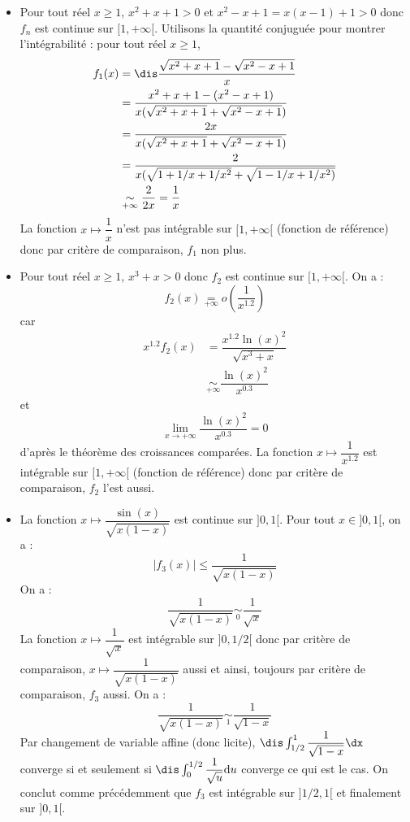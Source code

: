 \documentclass[a4paper,10pt]{report}
\begin{document}
\begin{itemize}
\item Pour tout réel $x \geq 1$, $x^2+x+1 > 0$ et $x^2-x+1=x(x-1)+1 >0$ donc $f_n$ est continue sur $[1, + \infty[$. Utilisons la quantité conjuguée pour montrer l'intégrabilité : pour tout réel $x \geq 1$,
\begin{align*}
f_1(x) & =\dis\frac{\sqrt{x^2+x+1}-\sqrt{x^2-x+1}}{x} \\
& = \dfrac{x^2+x+1-(x^2-x+1)}{x(\sqrt{x^2+x+1}+\sqrt{x^2-x+1})} \\
& = \dfrac{2x}{x(\sqrt{x^2+x+1}+\sqrt{x^2-x+1})} \\
& = \dfrac{2}{x(\sqrt{1+1/x+1/x^2}+ \sqrt{1-1/x+1/x^2)}} \\
& \underset{+ \infty}{\sim} \dfrac{2}{2x} = \dfrac{1}{x}
\end{align*}
La fonction $x \mapsto \dfrac{1}{x}$ n'est pas intégrable sur $[1, + \infty[$ (fonction de référence) donc par critère de comparaison, $f_1$ non plus.
\item Pour tout réel $x \geq 1$, $x^3+x>0$ donc $f_2$ est continue sur $[1, + \infty[$. On a :
$$ f_2(x) \underset{+\infty}{=} o \left( \dfrac{1}{x^{1.2}} \right)$$
car 
\begin{align*}
x^{1.2} f_2(x) & = \dfrac{x^{1.2} \ln(x)^2}{\sqrt{x^3+x}} \\
&  \underset{+ \infty}{\sim} \dfrac{\ln(x)^2}{x^{0.3}} 
\end{align*}
et 
$$ \lim_{x \rightarrow + \infty} \dfrac{\ln(x)^2}{x^{0.3}}  = 0$$
d'après le théorème des croissances comparées. La fonction $x \mapsto \dfrac{1}{x^{1.2}}$ est intégrable sur $[1, + \infty[$ (fonction de référence) donc par critère de comparaison, $f_2$ l'est aussi.
\item La fonction $x \mapsto \dfrac{\sin(x)}{\sqrt{x(1-x)}}$ est continue sur $]0,1[$. Pour tout $x \in ]0,1[$, on a :
$$ \vert f_3(x) \vert \leq \dfrac{1}{\sqrt{x(1-x)}}$$
On a :
$$ \dfrac{1}{\sqrt{x(1-x)}} \underset{0}{\sim} \dfrac{1}{\sqrt{x}}$$
La fonction $x \mapsto\dfrac{1}{\sqrt{x}}$ est intégrable sur $]0,1/2[$ donc par critère de comparaison, $x \mapsto \dfrac{1}{\sqrt{x(1-x)}}$ aussi et ainsi, toujours par critère de comparaison, $f_3$ aussi. On a :
$$  \dfrac{1}{\sqrt{x(1-x)}} \underset{1}{\sim} \dfrac{1}{\sqrt{1-x}}$$
Par changement de variable affine (donc licite), $\dis \int_{1/2}^1 \dfrac{1}{\sqrt{1-x}} \dx$ converge si et seulement si $\dis \int_{0}^{1/2} \dfrac{1}{\sqrt{u}} \textrm{d}u$ converge ce qui est le cas. On conclut comme précédemment que $f_3$ est intégrable sur $]1/2,1[$ et finalement sur $]0,1[$.

\end{itemize}
\end{document}
